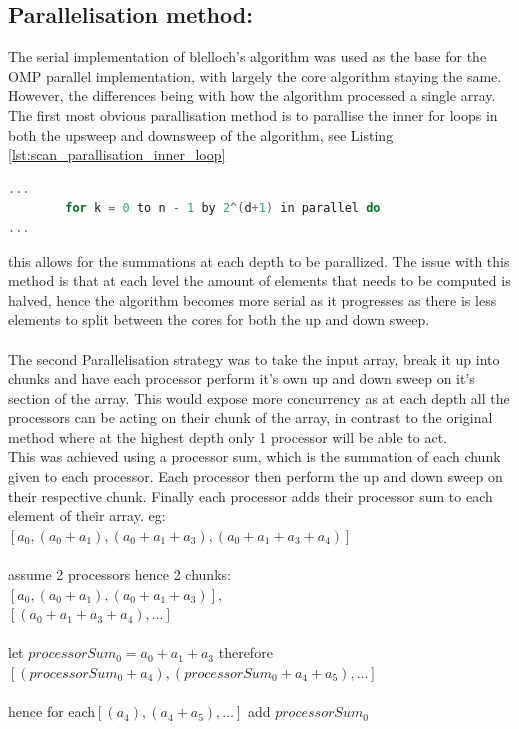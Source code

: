 \subsection*{Parallelisation method:}
The serial implementation of blelloch's algorithm was used as the base for the OMP parallel implementation, with largely the core algorithm staying the same. However, the differences being with how the algorithm processed a single array. The first most obvious parallisation method is to parallise the inner for loops in both the upsweep and downsweep of the algorithm, see Listing \ref{lst:scan_parallisation_inner_loop} 
\begin{lstlisting}[language=C, caption={parallisation of the inner loop}, label={lst:scan_parallisation_inner_loop}]
...
		for k = 0 to n - 1 by 2^(d+1) in parallel do
...
\end{lstlisting}
this allows for the summations at each depth to be parallized. The issue with this method is that at each level the amount of elements that needs to be computed is halved, hence the algorithm becomes more serial as it progresses as there is less elements to split between the cores for both the up and down sweep.\\\\ The second Parallelisation strategy was to take the input array, break it up into chunks and have each processor perform it's own up and down sweep on it's section of the array. This would expose more concurrency as at each depth all the processors can be acting on their chunk of the array, in contrast to the original method where at the highest depth only 1 processor will be able to act.\\This was achieved using a processor sum, which is the summation of each chunk given to each processor. Each processor then perform the up and down sweep on their respective chunk. Finally each processor adds their processor sum to each element of their array. 
eg: $[a_0,(a_0+a_1),(a_0+a_1+a_3),(a_0+a_1+a_3+a_4)]$\\
\\ assume 2 processors hence 2 chunks:\\
$[a_0,(a_0+a_1),(a_0+a_1+a_3)]$,\\$[(a_0+a_1+a_3+a_4),\dots]$\\
\\let $processorSum_0 = a_0+a_1+a_3$ therefore\\
$[(processorSum_0+a_4),(processorSum_0 + a_4 +a_5),\dots] $\\\\hence for each$ [(a_4),(a_4 +a_5),\dots]$ add $processorSum_0$\\

